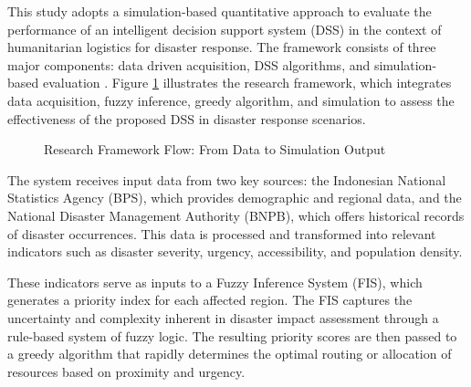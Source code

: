 \documentclass[journal,final,a4paper,twoside,11pt]{IEEEtran}
\begin{document}
This study adopts a simulation-based quantitative approach to evaluate the performance of an intelligent decision support system (DSS) in the context of humanitarian logistics for disaster response. The framework consists of three major components: data driven acquisition, DSS algorithms, and simulation-based evaluation \cite{mahmoodi2024data}. Figure \ref{fig:research_framework} illustrates the research framework, which integrates data acquisition, fuzzy inference, greedy algorithm, and simulation to assess the effectiveness of the proposed DSS in disaster response scenarios.

\begin{figure}[htbp]
\centering
{}
\caption{Research Framework Flow: From Data to Simulation Output}
\label{fig:research_framework}
\end{figure}

The system receives input data from two key sources: the Indonesian National Statistics Agency (BPS), which provides demographic and regional data, and the National Disaster Management Authority (BNPB), which offers historical records of disaster occurrences. This data is processed and transformed into relevant indicators such as disaster severity, urgency, accessibility, and population density.

These indicators serve as inputs to a Fuzzy Inference System (FIS), which generates a priority index for each affected region. The FIS captures the uncertainty and complexity inherent in disaster impact assessment through a rule-based system of fuzzy logic. The resulting priority scores are then passed to a greedy algorithm that rapidly determines the optimal routing or allocation of resources based on proximity and urgency.
\end{document}
